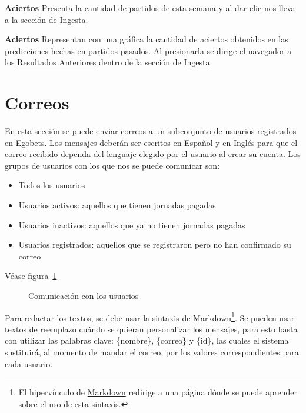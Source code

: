 \textbf{Aciertos}
Presenta la cantidad de partidos de esta semana y al dar clic nos lleva a la sección de \underline{Ingesta}.

\textbf{Aciertos}
Representan con una gráfica la cantidad de aciertos obtenidos en las predicciones hechas en partidos pasados. Al presionarla se dirige el navegador a los \underline{Resultados Anteriores} dentro de la sección de \underline{Ingesta}.

\section{Correos}

En esta sección se puede enviar correos a un subconjunto de usuarios registrados en Egobets. Los mensajes deberán ser escritos en Español y en Inglés para que el correo recibido dependa del lenguaje elegido por el usuario al crear su cuenta. Los grupos de usuarios con los que nos se puede comunicar son:

\begin{itemize}
	\item Todos los usuarios
	\item Usuarios activos: aquellos que tienen jornadas pagadas
	\item Usuarios inactivos: aquellos que ya no tienen jornadas pagadas
	\item Usuarios registrados: aquellos que se registraron pero no han confirmado su correo
\end{itemize}
Véase figura~\ref{Fig:correos}

\begin{figure}[!htb]\centering
   \begin {minipage}{0.8\textwidth}
     \caption{Comunicación con los usuarios}
	 \label{Fig:correos}
   \end{minipage}
\end{figure}

Para redactar los textos, se debe usar la sintaxis de Markdown\footnote{El hipervínculo de \underline{Markdown} redirige a una página dónde se puede aprender sobre el uso de esta sintaxis.}.
Se pueden usar textos de reemplazo cuándo se quieran personalizar los mensajes, para esto basta con utilizar las palabras clave: \{nombre\}, \{correo\} y \{id\}, las cuales el sistema sustituirá, al momento de mandar el correo, por los valores correspondientes para cada usuario.


